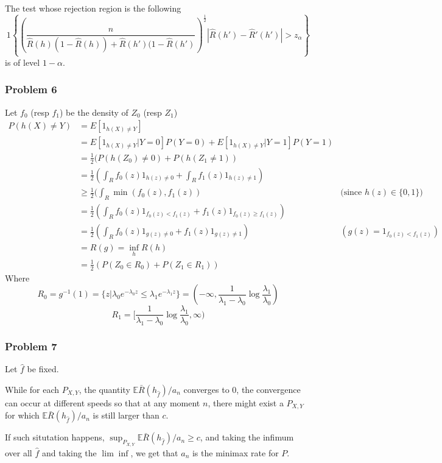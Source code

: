 \emph{}\documentclass[12pt]{article}
\newcommand{\Q}[1]{\subsubsection*{Problem #1}}
\begin{document}
The test whose rejection region is the following 
$$1\left\{ \left(\frac n {\hat R(h)(1-\hat R(h))+\hat R(h')(1-\hat R(h')}\right)^{\frac12} |\hat R(h') - \hat R'(h')| > z_\alpha\right\}$$
is of level $1-\alpha$.

\Q{6}
Let $f_0$ (resp $f_1$) be the density of $Z_0$ (resp $Z_1$)
\begin{align*}
  P(h(X) \ne Y) &= E[1_{h(X) \ne Y}]
  \\ &= E[1_{h(X) \ne Y} | Y = 0] P(Y = 0) + E[1_{h(X) \ne Y} | Y = 1] P(Y = 1)
  \\ &= \frac12 (P(h(Z_0) \ne 0) + P(h(Z_1 \ne 1))
  \\ &= \frac12 (\int_R f_0(z) 1_{h(z) \ne 0} + \int_R f_1(z) 1_{h(z) \ne 1})
  \\ &\ge \frac12 (\int_R \min(f_0(z), f_1(z)) &\text{(since $h(z) \in \{0,1\}$)}
  \\ &= \frac12 (\int_R f_0(z) 1_{f_0(z) < f_1(z)}+  f_1(z) 1_{f_0(z) \ge f_1(z)})
  \\ &= \frac12 (\int_R f_0(z) 1_{g(z) \ne 0}+  f_1(z) 1_{g(z) \ne 1}) &(g(z) = 1_{f_0(z) < f_1(z)})
  \\&= R(g) = \inf_h R(h)
  \\&= \frac12 (P(Z_0 \in R_0) + P(Z_1 \in R_1))
\end{align*}
Where
$$R_0 = g^{-1}(1) = \{z | \lambda_0 e^{-\lambda_0 z} \le \lambda_1 e^{-\lambda_1 z} \} = (-\infty, \frac1{\lambda_1 - \lambda_0} \log \frac{\lambda_1}{\lambda_0})$$
$$R_1 = [\frac1{\lambda_1 - \lambda_0} \log \frac{\lambda_1}{\lambda_0} , \infty)$$


\Q{7}

Let $\hat f$ be fixed.

While for each $P_{X,Y}$, the quantity $\mathbb E \bar R(h_{\hat f}) / a_n$ converges to 0, the convergence can occur at different speeds so that at any moment $n$, there might exist a $P_{X,Y}$ for which $\mathbb E \bar R(h_{\hat f}) / a_n$ is still larger than $c$. 

If such situtation happens, $\sup_{P_{X,Y}} \mathbb E \bar R(h_{\hat f}) / a_n \ge c$, and taking the infimum over all $\hat f$ and taking the $\lim \inf$, we get that $a_n$ is the minimax rate for $P$.
\end{document}
